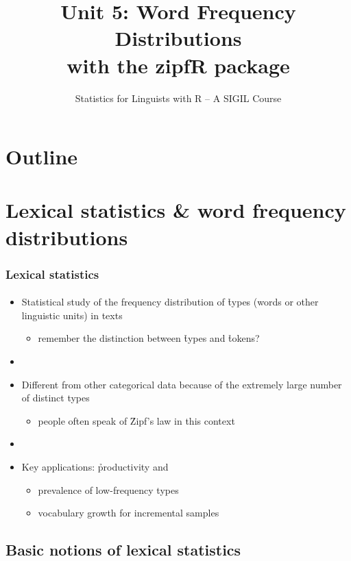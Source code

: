 \documentclass[t]{beamer} %
\title[5.\ WFD \& zipfR]{Unit 5: Word Frequency Distributions\\ 
  with the zipfR package}
\subtitle{Statistics for Linguists with R -- A SIGIL Course}
\begin{document}
\frame{\titlepage}


\section*{Outline}

\section{Lexical statistics \& word frequency distributions}

\begin{frame}
  \frametitle{Lexical statistics}
  \framesubtitle{\citet{Zipf:49,Zipf:65,Baayen:01,Baroni:08}}

  \begin{itemize}
  \item Statistical study of the frequency distribution of \h{types} (words or
    other linguistic units) in texts
    \begin{itemize}
    \item remember the distinction between \h{types} and \h{tokens}?
    \end{itemize}
  \item[]
  \item Different from other categorical data because of the extremely large
    number of distinct types
    \begin{itemize}
    \item people often speak of \h{Zipf's law} in this context
    \end{itemize}
  \item[]
  \item Key applications: \h{productivity} and 
    \begin{itemize}
    \item prevalence of low-frequency types
    \item vocabulary growth for incremental samples
    \end{itemize}
  \end{itemize}
\end{frame} 

\subsection{Basic notions of lexical statistics}
\end{document}
